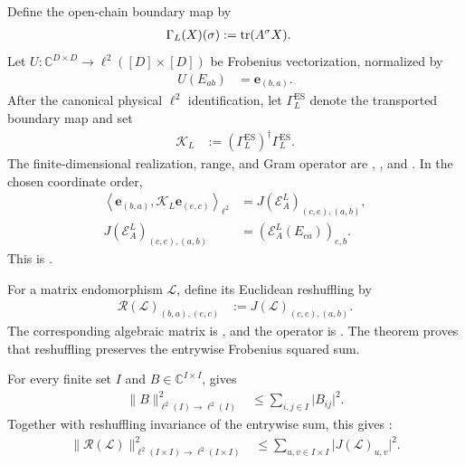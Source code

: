 \documentclass{article}
\begin{document}
Define the open-chain boundary map by
\begin{align}
    \Gamma_L(X)(\sigma)
     & :=\operatorname{tr}(A^\sigma X).
    \label{eq:cpgsv21_martingale_overlap_boundary_map}
\end{align}
Let $U\colon\mathbb C^{D\times D}\to\ell^2([D]\times[D])$ be Frobenius
vectorization, normalized by
\begin{align}
    U(E_{ab})
     & =\mathbf e_{(b,a)}.
    \label{eq:cpgsv21_martingale_overlap_frobenius_vectorization}
\end{align}
After the canonical physical $\ell^2$ identification, let
$\Gamma_L^{\mathrm{ES}}$ denote the transported boundary map and set
\begin{align}
    \mathcal K_L
     & :=
    (\Gamma_L^{\mathrm{ES}})^\dagger\Gamma_L^{\mathrm{ES}}.
    \label{eq:cpgsv21_martingale_overlap_ground_space_gram}
\end{align}
The finite-dimensional realization, range, and Gram operator are
,
, and
. In the chosen coordinate order,
\begin{align}
    \left\langle
    \mathbf e_{(b,a)},\mathcal K_L\mathbf e_{(e,c)}
    \right\rangle_{\ell^2}
     & =J(\mathcal E_A^L)_{(c,e),(a,b)},
    \label{eq:cpgsv21_martingale_overlap_gram_choi_entry} \\
    J(\mathcal E_A^L)_{(c,e),(a,b)}
     & =(\mathcal E_A^L(E_{ca}))_{e,b}.
    \label{eq:cpgsv21_martingale_overlap_gram_transfer_entry}
\end{align}
This is
.

For a matrix endomorphism $\mathcal L$, define its Euclidean reshuffling by
\begin{align}
    \mathscr R(\mathcal L)_{(b,a),(e,c)}
     & :=
    J(\mathcal L)_{(c,e),(a,b)}.
    \label{eq:cpgsv21_martingale_overlap_gram_reshuffling}
\end{align}
The corresponding algebraic matrix is
, and the operator is
. The theorem
 proves
that reshuffling preserves the entrywise Frobenius squared sum.

For every finite set $I$ and $B\in\mathbb C^{I\times I}$,
 gives
\begin{align}
    \lVert B\rVert_{\ell^2(I)\to\ell^2(I)}^2
     & \leq\sum_{i,j\in I}\lvert B_{ij}\rvert^2.
    \label{eq:cpgsv21_martingale_overlap_matrix_operator_frobenius_bound}
\end{align}
Together with reshuffling invariance of the entrywise sum, this gives
:
\begin{align}
    \lVert\mathscr R(\mathcal L)\rVert_{
        \ell^2(I\times I)\to\ell^2(I\times I)}^2
     & \leq
    \sum_{u,v\in I\times I}\lvert J(\mathcal L)_{u,v}\rvert^2.
    \label{eq:cpgsv21_martingale_overlap_reshuffled_choi_bound}
\end{align}
\end{document}
